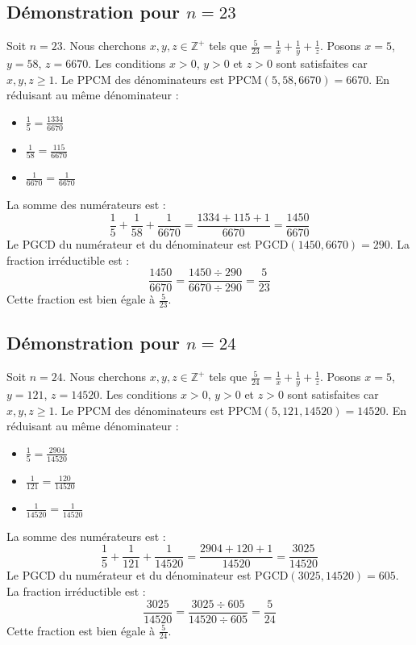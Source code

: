 \documentclass[11pt,a4paper]{article}
\begin{document}
\subsection{Démonstration pour $n = 23$}
Soit $n = 23$. Nous cherchons $x, y, z \in \mathbb{Z}^{+}$ tels que $\frac{5}{23} = \frac{1}{x} + \frac{1}{y} + \frac{1}{z}$.
Posons $x = 5$, $y = 58$, $z = 6670$.
Les conditions $x > 0$, $y > 0$ et $z > 0$ sont satisfaites car $x, y, z \geq 1$.
Le PPCM des dénominateurs est $\text{PPCM}(5, 58, 6670) = 6670$.
En réduisant au même dénominateur :
\begin{itemize}
    \item $\frac{1}{5} = \frac{1334}{6670}$
    \item $\frac{1}{58} = \frac{115}{6670}$
    \item $\frac{1}{6670} = \frac{1}{6670}$
\end{itemize}
La somme des numérateurs est :
$$ \frac{1}{5} + \frac{1}{58} + \frac{1}{6670} = \frac{1334 + 115 + 1}{6670} = \frac{1450}{6670} $$
Le PGCD du numérateur et du dénominateur est $\text{PGCD}(1450, 6670) = 290$.
La fraction irréductible est :
$$ \frac{1450}{6670} = \frac{1450 \div 290}{6670 \div 290} = \frac{5}{23} $$
Cette fraction est bien égale à $\frac{5}{23}$.

\subsection{Démonstration pour $n = 24$}
Soit $n = 24$. Nous cherchons $x, y, z \in \mathbb{Z}^{+}$ tels que $\frac{5}{24} = \frac{1}{x} + \frac{1}{y} + \frac{1}{z}$.
Posons $x = 5$, $y = 121$, $z = 14520$.
Les conditions $x > 0$, $y > 0$ et $z > 0$ sont satisfaites car $x, y, z \geq 1$.
Le PPCM des dénominateurs est $\text{PPCM}(5, 121, 14520) = 14520$.
En réduisant au même dénominateur :
\begin{itemize}
    \item $\frac{1}{5} = \frac{2904}{14520}$
    \item $\frac{1}{121} = \frac{120}{14520}$
    \item $\frac{1}{14520} = \frac{1}{14520}$
\end{itemize}
La somme des numérateurs est :
$$ \frac{1}{5} + \frac{1}{121} + \frac{1}{14520} = \frac{2904 + 120 + 1}{14520} = \frac{3025}{14520} $$
Le PGCD du numérateur et du dénominateur est $\text{PGCD}(3025, 14520) = 605$.
La fraction irréductible est :
$$ \frac{3025}{14520} = \frac{3025 \div 605}{14520 \div 605} = \frac{5}{24} $$
Cette fraction est bien égale à $\frac{5}{24}$.
\end{document}

